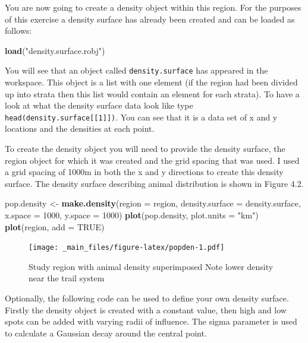 \documentclass[]{book}
\newenvironment{Shaded}{\begin{snugshade}}{\end{snugshade}}
\newcommand{\KeywordTok}[1]{\textcolor[rgb]{0.13,0.29,0.53}{\textbf{#1}}}
\newcommand{\DataTypeTok}[1]{\textcolor[rgb]{0.13,0.29,0.53}{#1}}
\newcommand{\DecValTok}[1]{\textcolor[rgb]{0.00,0.00,0.81}{#1}}
\newcommand{\StringTok}[1]{\textcolor[rgb]{0.31,0.60,0.02}{#1}}
\newcommand{\OtherTok}[1]{\textcolor[rgb]{0.56,0.35,0.01}{#1}}
\newcommand{\NormalTok}[1]{#1}
\theoremstyle{definition}
\theoremstyle{definition}
\theoremstyle{remark}
\begin{document}
You are now going to create a density object within this region. For the
purposes of this exercise a density surface has already been created and
can be loaded as follows:

\begin{Shaded}
\begin{Highlighting}[]
\KeywordTok{load}\NormalTok{(}\StringTok{"density.surface.robj"}\NormalTok{)}
\end{Highlighting}
\end{Shaded}

You will see that an object called \texttt{density.surface} has appeared
in the workspace. This object is a list with one element (if the region
had been divided up into strata then this list would contain an element
for each strata). To have a look at what the density surface data look
like type \texttt{head(density.surface{[}{[}1{]}{]})}. You can see that
it is a data set of x and y locations and the densities at each point.

To create the density object you will need to provide the density
surface, the region object for which it was created and the grid spacing
that was used. I used a grid spacing of 1000m in both the x and y
directions to create this density surface. The density surface
describing animal distribution is shown in Figure 4.2.

\begin{Shaded}
\begin{Highlighting}[]
\NormalTok{pop.density <-}\StringTok{ }\KeywordTok{make.density}\NormalTok{(}\DataTypeTok{region =}\NormalTok{ region, }\DataTypeTok{density.surface =}\NormalTok{ density.surface, }
                            \DataTypeTok{x.space =} \DecValTok{1000}\NormalTok{, }\DataTypeTok{y.space =} \DecValTok{1000}\NormalTok{) }
\KeywordTok{plot}\NormalTok{(pop.density, }\DataTypeTok{plot.units =} \StringTok{"km"}\NormalTok{)}
\KeywordTok{plot}\NormalTok{(region, }\DataTypeTok{add =} \OtherTok{TRUE}\NormalTok{)}
\end{Highlighting}
\end{Shaded}

\begin{figure}
\centering
\texttt{[image: \_main\_files/figure-latex/popden-1.pdf]}
\caption{\label{fig:popden}Study region with animal density superimposed
Note lower density near the trail system}
\end{figure}

Optionally, the following code can be used to define your own density
surface. Firstly the density object is created with a constant value,
then high and low spots can be added with varying radii of influence.
The sigma parameter is used to calculate a Gaussian decay around the
central point.
\end{document}
